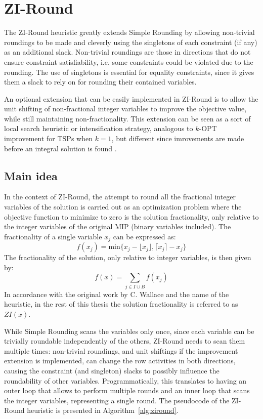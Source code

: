 \documentclass[a4paper,12pt,twoside]{scrbook}
\begin{document}
\section{ZI-Round}
The ZI-Round heuristic greatly extends Simple Rounding by allowing non-trivial roundings to be made and cleverly using the singletons of each constraint (if any) as an additional slack. Non-trivial roundings are those in directions that do not ensure constraint satisfiability, i.e. some constraints could be violated due to the rounding. The use of singletons is essential for equality constraints, since it gives them a slack to rely on for rounding their contained variables. \par

An optional extension that can be easily implemented in ZI-Round is to allow the unit shifting of non-fractional integer variables to improve the objective value, while still maintaining non-fractionality. This extension can be seen as a sort of local search heuristic \cite{linker1973} or intensification strategy, analogous to $k$-OPT improvement for TSPs when $k = 1$, but different since imrovements are made before an integral solution is found \cite{wallace2010}. \par

\subsection{Main idea}
In the context of ZI-Round, the attempt to round all the fractional integer variables of the solution is carried out as an optimization problem where the objective function to minimize to zero is the solution fractionality, only relative to the integer variables of the original MIP (binary variables included). The fractionality of a single variable $x_j$ can be expressed as:
\begin{equation}
	f(x_j) = \text{min}\{x_j - \lfloor x_j \rfloor, \lceil x_j \rceil - x_j\}
\end{equation}
The fractionality of the solution, only relative to integer variables, is then given by:
\begin{equation}\label{eq:zi}
	f(x) = \sum_{j \in I \cup B}f(x_j)
\end{equation}
In accordance with the original work by C. Wallace \cite{wallace2010} and the name of the heuristic, in the rest of this thesis the solution fractionality is referred to as $ZI(x)$. \par 

While Simple Rounding scans the variables only once, since each variable can be trivially roundable independently of the others, ZI-Round needs to scan them multiple times: non-trivial roundings, and unit shiftings if the improvement extension is implemented, can change the row activities in both directions, causing the constraint (and singleton) slacks to possibly influence the roundability of other variables. Programmatically, this translates to having an outer loop that allows to perform multiple rounds and an inner loop that scans the integer variables, representing a single round. The pseudocode of the ZI-Round heuristic is presented in Algorithm~\ref{alg:ziround}. \par 
\end{document}
